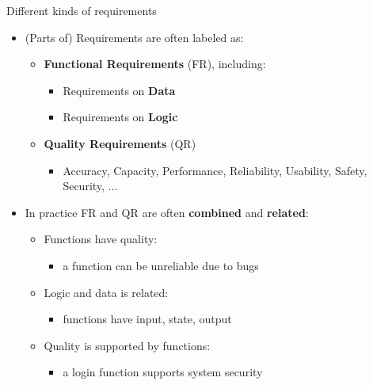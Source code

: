 \begin{Slide}{Different kinds of requirements}

\begin{itemize}
\item (Parts of) Requirements are often labeled as:
\begin{itemize}
\item \textbf{Functional Requirements} (FR), including:
\begin{itemize}
\item Requirements on \textbf{Data}
\item Requirements on \textbf{Logic}
\end{itemize}
\item \textbf{Quality Requirements} (QR)
\begin{itemize}
\item Accuracy, Capacity, Performance, Reliability, Usability, Safety, Security, ...
\end{itemize}
\end{itemize}
\item In practice FR and QR are often \textbf{combined} and \textbf{related}:
\begin{itemize}
\item Functions have quality:
\begin{itemize}
\item a function can be unreliable due to bugs 
\end{itemize}
\item Logic and data is related: 
\begin{itemize}
\item functions have input, state, output
\end{itemize}
\item Quality is supported by functions: 
\begin{itemize}
\item a login function supports system security


\end{itemize}
\end{itemize}
\end{itemize}
\end{Slide}